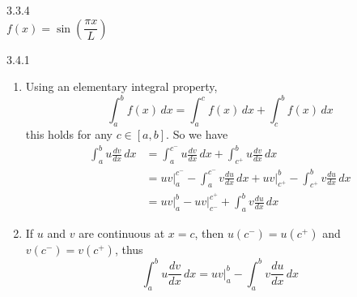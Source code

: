 \documentclass{article}
\theoremstyle{definition}
\begin{document}
	
	\begin{prob}{3.3.4} $  $ \vspace{2mm} \\
		$ f(x) = \sin\left( \dfrac{\pi x}{L} \right) $
		\begin{center}
		\end{center}
	\end{prob}

	\begin{prob}{3.4.1} $  $ 
		\begin{enumerate}[label=\alph*.)]
			\item Using an elementary integral property,
			\[
				\int_a^b f(x) \, dx = \int_a^c f(x) \, dx + \int_c^b f(x) \, dx
			\]
			this holds for any $ c \in [a,b] $. So we have
			\begin{align*}
				\int_a^b u \frac{dv}{dx} \, dx &= \int_{a}^{c^-} u \frac{dv}{dx} \, dx + \int_{c^+}^{b} u \frac{dv}{dx} \, dx \\
				&=  uv \bigg|_{a}^{c^{-}} - \int_{a}^{c^{-}} v \frac{du}{dx} \, dx + uv \bigg|_{c^{+}}^{b} - \int_{c^{+}}^{b} v \frac{du}{dx} \,dx \\
				&= \boxed{ uv \bigg|_{a}^{b} - uv \bigg|_{c^{-}}^{c^{+}} + \int_{a}^{b} v \frac{du}{dx} \,dx }
			\end{align*}
			\item  If $ u $ and $ v $ are continuous at $ x=c $, then $ u(c^{-}) = u(c^{+}) $ and $ v(c^{-}) = v(c^{+}) $, thus
			\[
				\int_a^b u \frac{dv}{dx} \, dx = uv \bigg|_{a}^{b} - \int_a^b v \frac{du}{dx} \, dx
			\]
		\end{enumerate}
	\end{prob}

	
\end{document}
